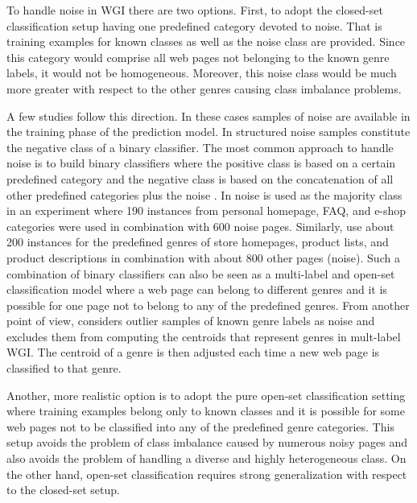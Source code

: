 To handle noise in WGI there are two options. First, to adopt the closed-set classification setup having one predefined category devoted to noise. That is training examples for known classes as well as the noise class are provided. Since this category would comprise all web pages not belonging to the known genre labels, it would not be homogeneous. Moreover, this noise class would be much more greater with respect to the other genres causing class imbalance problems. 

A few studies follow this direction. In these cases samples of noise are available in the training phase of the prediction model. In \parencite{Vidulin2007} structured noise samples constitute the negative class of a binary classifier. The most common approach to handle noise is to build binary classifiers where the positive class is based on a certain predefined category and the negative class is based on the concatenation of all other predefined categories plus the noise \parencite{kennedy2005automatic}. In \parencite{dong2006binary} noise is used as the majority class in an experiment where 190 instances from personal homepage, FAQ, and e-shop categories were used in combination with 600 noise pages. Similarly, \parencite{levering2008using} use about 200 instances for the predefined genres of store homepages, product lists, and product descriptions in combination with about 800 other pages (noise). Such a combination of binary classifiers can also be seen as a multi-label and open-set classification model where a web page can belong to different genres and it is possible for one page not to belong to any of the predefined genres. From another point of view, \parencite{jebari2015combination} considers outlier samples of known genre labels as noise and excludes them from computing the centroids that represent genres in mult-label WGI. The centroid of a genre is then adjusted each time a new web page is classified to that genre. 

Another, more realistic option is to adopt the pure open-set classification setting where training examples belong only to known classes and it is possible for some web pages not to be classified into any of the predefined genre categories. This setup avoids the problem of class imbalance caused by numerous noisy pages and also avoids the problem of handling a diverse and highly heterogeneous class. On the other hand, open-set classification requires strong generalization with respect to the closed-set setup. 

